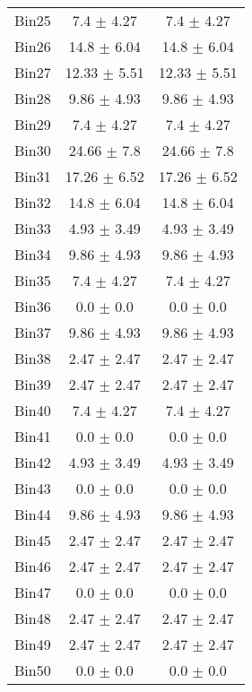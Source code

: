 \begin{tabular}{|c|c|c|}
     Bin25 & 7.4 $\pm$ 4.27 & 7.4 $\pm$ 4.27 \\ \cline{1-3} 
     Bin26 & 14.8 $\pm$ 6.04 & 14.8 $\pm$ 6.04 \\ \cline{1-3} 
     Bin27 & 12.33 $\pm$ 5.51 & 12.33 $\pm$ 5.51 \\ \cline{1-3} 
     Bin28 & 9.86 $\pm$ 4.93 & 9.86 $\pm$ 4.93 \\ \cline{1-3} 
     Bin29 & 7.4 $\pm$ 4.27 & 7.4 $\pm$ 4.27 \\ \cline{1-3} 
     Bin30 & 24.66 $\pm$ 7.8 & 24.66 $\pm$ 7.8 \\ \cline{1-3} 
     Bin31 & 17.26 $\pm$ 6.52 & 17.26 $\pm$ 6.52 \\ \cline{1-3} 
     Bin32 & 14.8 $\pm$ 6.04 & 14.8 $\pm$ 6.04 \\ \cline{1-3} 
     Bin33 & 4.93 $\pm$ 3.49 & 4.93 $\pm$ 3.49 \\ \cline{1-3} 
     Bin34 & 9.86 $\pm$ 4.93 & 9.86 $\pm$ 4.93 \\ \cline{1-3} 
     Bin35 & 7.4 $\pm$ 4.27 & 7.4 $\pm$ 4.27 \\ \cline{1-3} 
     Bin36 & 0.0 $\pm$ 0.0 & 0.0 $\pm$ 0.0 \\ \cline{1-3} 
     Bin37 & 9.86 $\pm$ 4.93 & 9.86 $\pm$ 4.93 \\ \cline{1-3} 
     Bin38 & 2.47 $\pm$ 2.47 & 2.47 $\pm$ 2.47 \\ \cline{1-3} 
     Bin39 & 2.47 $\pm$ 2.47 & 2.47 $\pm$ 2.47 \\ \cline{1-3} 
     Bin40 & 7.4 $\pm$ 4.27 & 7.4 $\pm$ 4.27 \\ \cline{1-3} 
     Bin41 & 0.0 $\pm$ 0.0 & 0.0 $\pm$ 0.0 \\ \cline{1-3} 
     Bin42 & 4.93 $\pm$ 3.49 & 4.93 $\pm$ 3.49 \\ \cline{1-3} 
     Bin43 & 0.0 $\pm$ 0.0 & 0.0 $\pm$ 0.0 \\ \cline{1-3} 
     Bin44 & 9.86 $\pm$ 4.93 & 9.86 $\pm$ 4.93 \\ \cline{1-3} 
     Bin45 & 2.47 $\pm$ 2.47 & 2.47 $\pm$ 2.47 \\ \cline{1-3} 
     Bin46 & 2.47 $\pm$ 2.47 & 2.47 $\pm$ 2.47 \\ \cline{1-3} 
     Bin47 & 0.0 $\pm$ 0.0 & 0.0 $\pm$ 0.0 \\ \cline{1-3} 
     Bin48 & 2.47 $\pm$ 2.47 & 2.47 $\pm$ 2.47 \\ \cline{1-3} 
     Bin49 & 2.47 $\pm$ 2.47 & 2.47 $\pm$ 2.47 \\ \cline{1-3} 
     Bin50 & 0.0 $\pm$ 0.0 & 0.0 $\pm$ 0.0 \\ \cline{1-3} 

\end{tabular}
